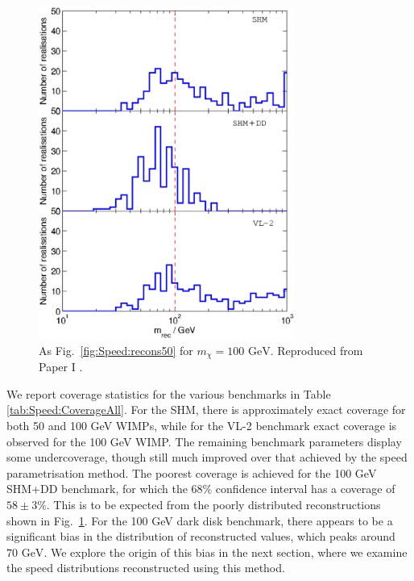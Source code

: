  \begin{figure}[t]
\centering
\includegraphics[width=0.75\textwidth]{Speed/100GeV-1.eps}
\caption[As Fig.~\ref{fig:Speed:recons50} for \(m_\chi = 100 \textrm{ GeV}\)]{As Fig.\ \ref{fig:Speed:recons50} for \(m_\chi = 100 \textrm{ GeV}\). Reproduced from Paper I \cite{Kavanagh:2012}.}
  \label{fig:Speed:recons100}
\end{figure}


We report coverage statistics for the various benchmarks in Table \ref{tab:Speed:CoverageAll}. For the SHM, there is approximately exact coverage for both 50 and 100 GeV WIMPs, while for the VL-2 benchmark exact coverage is observed for the 100 GeV WIMP. The remaining benchmark parameters display some undercoverage, though still much improved over that achieved by the speed parametrisation method. The poorest coverage is achieved for the 100 GeV SHM+DD benchmark, for which the 68\% confidence interval has a coverage of \(58 \pm 3 \%\). This is to be expected from the poorly distributed reconstructions shown in Fig.\ \ref{fig:Speed:recons100}. For the 100 GeV dark disk benchmark, there appears to be a significant bias in the distribution of reconstructed values, which peaks around \(70 \textrm{ GeV}\). We explore the origin of this bias in the next section, where we examine the speed distributions reconstructed using this method.

